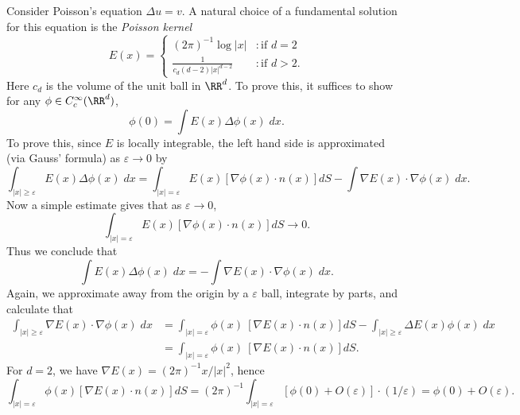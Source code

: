 \begin{example}
    Consider Poisson's equation $\Delta u = v$. A natural choice of a fundamental solution for this equation is the \emph{Poisson kernel}
    \[ E(x) = \begin{cases} (2\pi)^{-1} \log |x| &: \text{if $d = 2$} \\ \frac{1}{c_d (d-2) |x|^{d-2}} &: \text{if $d > 2$.} \end{cases} \]
    Here $c_d$ is the volume of the unit ball in $\RR^d$. To prove this, it suffices to show for any $\phi \in C_c^\infty(\RR^d)$,
    \[ \phi(0) = \int E(x) \Delta \phi(x)\; dx. \]
    To prove this, since $E$ is locally integrable, the left hand side is approximated (via Gauss' formula) as $\varepsilon \to 0$ by
    \[ \int_{|x| \geq \varepsilon} E(x) \Delta \phi(x)\; dx = \int_{|x| = \varepsilon} E(x) [\nabla \phi(x) \cdot n(x)] dS - \int \nabla E(x) \cdot \nabla \phi(x)\; dx. \]
    Now a simple estimate gives that as $\varepsilon \to 0$,
    \[ \int_{|x| = \varepsilon} E(x) [\nabla \phi(x) \cdot n(x)] dS \to 0. \]
    Thus we conclude that
    \[ \int E(x) \Delta \phi(x)\; dx = - \int \nabla E(x) \cdot \nabla \phi(x)\; dx. \]
    Again, we approximate away from the origin by a $\varepsilon$ ball, integrate by parts, and calculate that
    \begin{align*}
        \int_{|x| \geq \varepsilon} \nabla E(x) \cdot \nabla \phi(x)\; dx &= \int_{|x| = \varepsilon} \phi(x)\ [\nabla E(x) \cdot n(x)] dS - \int_{|x| \geq \varepsilon} \Delta E(x) \phi(x)\; dx\\
        &= \int_{|x| = \varepsilon} \phi(x)\ [\nabla E(x) \cdot n(x)] dS.
    \end{align*}
    For $d = 2$, we have $\nabla E(x) = (2 \pi)^{-1} x/|x|^2$, hence
    \[ \int_{|x| = \varepsilon} \phi(x) [\nabla E(x) \cdot n(x)] dS = (2 \pi)^{-1} \int_{|x| = \varepsilon} [\phi(0) + O(\varepsilon)] \cdot (1/\varepsilon) = \phi(0) + O(\varepsilon). \]
\end{example}

